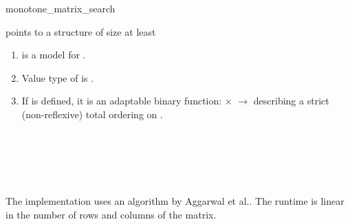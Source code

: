 \begin{ccRefFunction}{monotone_matrix_search}
\begin{ccAdvanced}
    \cgalColumnLayout
    \ccPrecond {} points to a structure of size at least

    \ccRequire
    \begin{enumerate}
    \item {} is a model for
      .
    \item Value type of  is .
    \item If  is defined, it is an adaptable
      binary function:  $\times$
       $\rightarrow$  describing a strict
      (non-reflexive) total ordering on .
    \end{enumerate}
    
    \ccSeeAlso
    \\
    \\
    \\
    \\

    \ccImplementation The implementation uses an algorithm by Aggarwal
    et al.\cite{akmsw-gamsa-87}. The runtime is linear in the number
    of rows and columns of the matrix.

  \end{ccAdvanced}  
\end{ccRefFunction}

